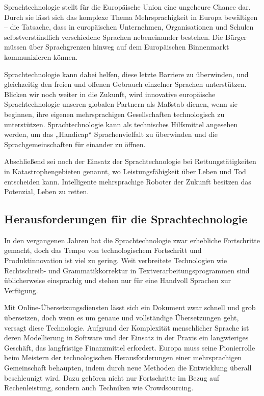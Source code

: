 \documentclass[]{../../metanetpaper}
\begin{document}
\begin{multicols}{2}
Sprachtechnologie stellt für die Europäische Union eine ungeheure Chance dar. Durch sie lässt sich das komplexe Thema Mehrsprachigkeit in Europa bewältigen – die Tatsache, dass in europäischen Unternehmen, Organisationen und Schulen selbstverständlich verschiedene Sprachen nebeneinander bestehen. Die Bürger müssen über Sprachgrenzen hinweg auf dem Europäischen Binnenmarkt kommunizieren können.


Sprachtechnologie kann dabei helfen, diese letzte Barriere zu überwinden, und gleichzeitig den freien und offenen Gebrauch einzelner Sprachen unterstützen. Blicken wir noch weiter in die Zukunft, wird innovative europäische Sprachtechnologie unseren globalen Partnern als Maßstab dienen, wenn sie  beginnen, ihre eigenen mehrsprachigen Gesellschaften technologisch zu unterstützen. Sprachtechnologie kann als technisches Hilfsmittel angesehen werden, um das „Handicap“ Sprachenvielfalt zu überwinden und die Sprachgemeinschaften für einander zu öffnen.

Abschließend sei noch der Einsatz der Sprachtechnologie bei Rettungstätigkeiten in Katastrophengebieten genannt, wo Leistungsfähigkeit über Leben und Tod entscheiden kann. Intelligente mehrsprachige Roboter der Zukunft besitzen das Potenzial, Leben zu retten.

\subsection{Herausforderungen für die Sprachtechnologie}

In den vergangenen Jahren hat die Sprachtechnologie zwar erhebliche Fortschritte gemacht, doch das Tempo von technologischem Fortschritt und Produktinnovation ist viel zu gering. Weit verbreitete Technologien wie Rechtschreib- und Grammatikkorrektur in Textverarbeitungsprogrammen sind üblicherweise einsprachig und stehen nur für eine Handvoll Sprachen zur Verfügung.


Mit On\-line-Über\-set\-zungs\-diensten lässt sich ein Dokument zwar schnell und grob übersetzen, doch wenn es um genaue und vollständige Übersetzungen geht, versagt diese Technologie. Aufgrund der Komplexität menschlicher Sprache ist deren Modellierung in Software und der Einsatz in der Praxis ein langwieriges Geschäft, das langfristige Finanzmittel erfordert. Europa muss seine Pionierrolle beim Meistern der technologischen Herausforderungen einer mehrsprachigen Gemeinschaft behaupten, indem durch neue Methoden die Entwicklung  überall  beschleunigt wird. Dazu gehören nicht nur Fortschritte im Bezug auf Rechenleistung, sondern auch Techniken wie Crowdsourcing.


\end{multicols}
\end{document}
